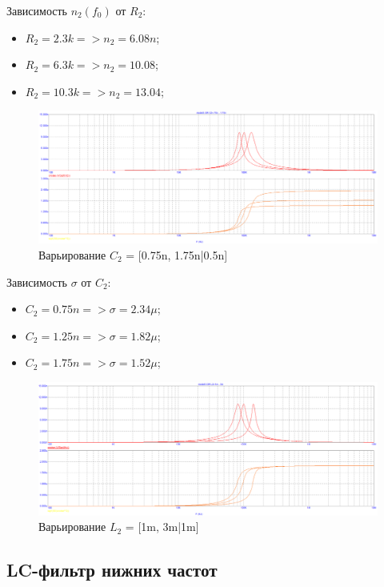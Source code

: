 \documentclass[a4paper, 12pt]{article}%
\begin{document}
\begin{enumerate}
Зависимость $n_2(f_0)$ от $R_2$:
\begin{itemize}
    \item $R_2 = 2.3k => n_2 = 6.08n$;
    \item $R_2 = 6.3k => n_2 = 10.08$;
    \item $R_2 = 10.3k => n_2 = 13.04$;
\end{itemize}

\begin{figure}[h!]
    \centering
    \includegraphics[scale=0.3]{images/mod3_2_4.png}
    \caption{Варьирование $C_2$ = [0.75n, 1.75n|0.5n]}
    \label{fig:m324}
\end{figure}

Зависимость $\sigma$ от $C_2$:
\begin{itemize}
    \item $C_2 = 0.75n => \sigma = 2.34\mu$;
    \item $C_2 = 1.25n => \sigma = 1.82\mu$;
    \item $C_2 = 1.75n => \sigma = 1.52\mu$;
\end{itemize}

\begin{figure}[h!]
    \centering
    \includegraphics[scale=0.3]{images/mod3_2_5.png}
    \caption{Варьирование $L_2$ = [1m, 3m|1m]}
    \label{fig:m325}
\end{figure}


\end{enumerate}

\subsection*{LC-фильтр нижних частот}
\end{document}
